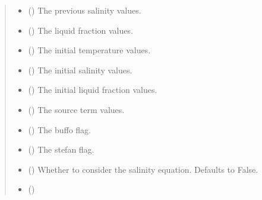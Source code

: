 \documentclass[a4paper,11pt,english,openany]{sphinxmanual}
\begin{document}
\begin{fulllineitems}
\begin{quote}
\begin{description}
\begin{itemize}
\item {} 
\sphinxAtStartPar
{} () \textendash{} The previous salinity values.

\item {} 
\sphinxAtStartPar
{} () \textendash{} The liquid fraction values.

\item {} 
\sphinxAtStartPar
{} () \textendash{} The initial temperature values.

\item {} 
\sphinxAtStartPar
{} () \textendash{} The initial salinity values.

\item {} 
\sphinxAtStartPar
{} () \textendash{} The initial liquid fraction values.

\item {} 
\sphinxAtStartPar
{} () \textendash{} The source term values.

\item {} 
\sphinxAtStartPar
{} () \textendash{} The buffo flag.

\item {} 
\sphinxAtStartPar
{} () \textendash{} The stefan flag.

\item {} 
\sphinxAtStartPar
{} (\sphinxstyleliteralemphasis{\sphinxupquote{, }}) \textendash{} Whether to consider the salinity equation. Defaults to False.

\item {} 
\sphinxAtStartPar
{} ()


\end{itemize}
\end{description}
\end{quote}
\end{fulllineitems}
\end{document}
